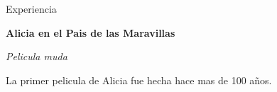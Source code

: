 \begin{rubric}{Experiencia}

    \textbf{Alicia en el Pais de las Maravillas}\par
    \textit{Pelicula muda}\par
    La primer pelicula de Alicia fue hecha hace mas de 100 años.
\end{rubric}
